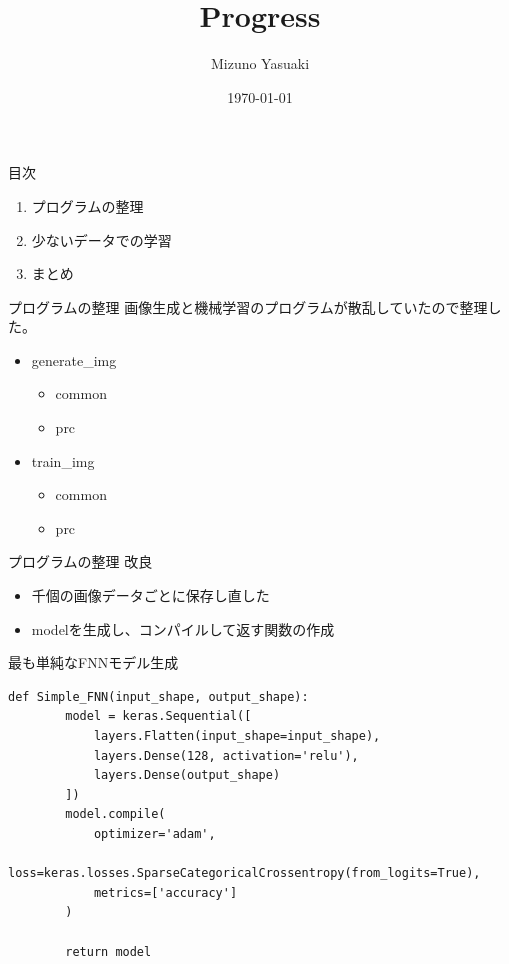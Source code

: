 \documentclass[dvipdfmx]{beamer}
\title{Progress}
\date{\today}
\author{Mizuno Yasuaki}
\begin{document}
  \maketitle
  
  \begin{frame}{目次}
    \begin{enumerate}
      \item プログラムの整理
      \item 少ないデータでの学習
      \item まとめ
    \end{enumerate}
  \end{frame}

  \begin{frame}{プログラムの整理}
    画像生成と機械学習のプログラムが散乱していたので整理した。
    \begin{itemize}
      \item generate\_img
      \begin{itemize}
        \item common
        \item prc
      \end{itemize}
      \item train\_img
      \begin{itemize}
        \item common
        \item prc
      \end{itemize}
    \end{itemize}
  \end{frame}

  \begin{frame}{プログラムの整理}
    改良
    \begin{itemize}
      \item 千個の画像データごとに保存し直した
      \item modelを生成し、コンパイルして返す関数の作成
    \end{itemize}
  \end{frame}

  \begin{frame}[fragile]{最も単純なFNNモデル生成}
    \begin{lstlisting}[caption=Simple\_FNN.py]
      def Simple_FNN(input_shape, output_shape):
        model = keras.Sequential([
            layers.Flatten(input_shape=input_shape),
            layers.Dense(128, activation='relu'),
            layers.Dense(output_shape)
        ])
        model.compile(
            optimizer='adam',
            loss=keras.losses.SparseCategoricalCrossentropy(from_logits=True),
            metrics=['accuracy']
        )
    
        return model
    \end{lstlisting}
  \end{frame}
\end{document}
